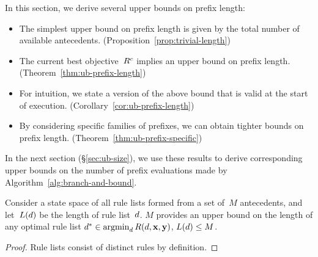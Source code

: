 \begin{arxiv}
In this section, we derive several upper bounds on prefix length:
\begin{itemize}
\item The simplest upper bound on prefix length is given by the total
number of available antecedents. (Proposition~\ref{prop:trivial-length})
%
\item The current best objective~${R^c}$ implies an upper bound
on prefix length. (Theorem~\ref{thm:ub-prefix-length})
%
\item For intuition, we state a version of the above bound that is valid
at the start of execution. (Corollary~\ref{cor:ub-prefix-length})
%
\item By considering specific families of prefixes,
we can obtain tighter bounds on prefix length. (Theorem~\ref{thm:ub-prefix-specific})
\end{itemize}
In the next section (\S\ref{sec:ub-size}), we use these results
to derive corresponding upper bounds on the number of
prefix evaluations made by Algorithm~\ref{alg:branch-and-bound}.

\begin{proposition}
\label{prop:trivial-length}
Consider a state space of all rule lists formed from
a set of~$M$ antecedents,
and let~$L({d})$ be the length of rule list~${d}$.
%
$M$ provides an upper bound on the length of
any optimal rule list
${d^* \in \operatorname*{argmin}_{d} R({d}, \mathbf{x}, \mathbf{y})}$,
\ie ${L({d}) \le M}$.
\end{proposition}

\begin{proof}
Rule lists consist of distinct rules by definition.
\end{proof}
\end{arxiv}

